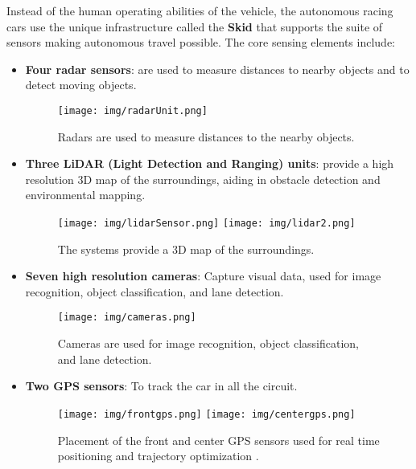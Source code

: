 \documentclass[a4paper,final,12pt]{report}
\begin{document}
Instead of the human operating abilities of the vehicle, the autonomous racing cars use the unique infrastructure called the \textbf{Skid} that supports the suite of sensors making autonomous travel possible. The core sensing elements include:
\newpage
\begin{itemize}
    \item \textbf{Four radar sensors}: are used to measure distances to nearby objects and to detect moving objects.
    \begin{figure}[hbtp]
    \centering
    \texttt{[image: img/radarUnit.png]}
    \caption{Radars are used to measure distances to the nearby objects. \cite{AbuDhabiRacing2024}}
    \label{figura:radarUnit}
    \end{figure}
    
    \item \textbf{Three LiDAR (Light Detection and Ranging) units}: provide a high resolution 3D map of the surroundings, aiding in obstacle detection and environmental mapping.
    \begin{figure}[hbtp]
    \centering
    \texttt{[image: img/lidarSensor.png]}
    \texttt{[image: img/lidar2.png]}
    \caption{The systems provide a 3D map of the surroundings. \cite{AbuDhabiRacing2024}}
    \label{figura:lidarSensor}
    \end{figure}

    \newpage
    \item \textbf{Seven high resolution cameras}: Capture visual data, used for image recognition, object classification, and lane detection.
    \begin{figure}[hbtp]
    \centering
    \texttt{[image: img/cameras.png]}
    \caption{Cameras are used for image recognition, object classification, and lane detection. \cite{AbuDhabiRacing2024}}
    \label{figura:cameras}
    \end{figure}

    \item \textbf{Two GPS sensors}: To track the car in all the circuit. 
    \begin{figure}[hbtp]
    \centering
    \texttt{[image: img/frontgps.png]}
    \texttt{[image: img/centergps.png]}
    \caption{Placement of the front and center GPS sensors used for real time positioning and trajectory optimization \cite{AbuDhabiRacing2024}.}
    \label{figura:gps}
    \end{figure}
\end{itemize}
\end{document}
